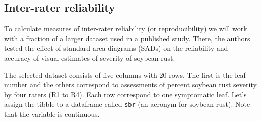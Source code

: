 \documentclass[
  letterpaper,
]{book}
\begin{document}
\hypertarget{inter-rater-reliability}{%
\subsection{Inter-rater reliability}\label{inter-rater-reliability}}

To calculate measures of inter-rater reliability (or reproducibility) we
will work with a fraction of a larger dataset used in a published
\href{https://bsppjournals.onlinelibrary.wiley.com/doi/abs/10.1111/ppa.13148}{study}.
There, the authors tested the effect of standard area diagrams (SADs) on
the reliability and accuracy of visual estimates of severity of soybean
rust.

The selected dataset consists of five columns with 20 rows. The first is
the leaf number and the others correspond to assessments of percent
soybean rust severity by four raters (R1 to R4). Each row correspond to
one symptomatic leaf. Let's assign the tibble to a dataframe called
\texttt{sbr} (an acronym for soybean rust). Note that the variable is
continuous.
\end{document}
